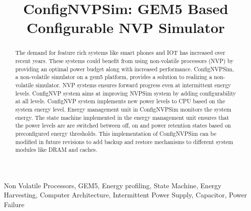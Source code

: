 \documentclass[conference]{IEEEtran}
\begin{document}
\title{ConfigNVPSim: GEM5 Based Configurable NVP Simulator\\
}

\author{
\and
{}
\and
{}
}

\maketitle

\begin{abstract}
The demand for feature rich systems like smart phones and IOT has increased over recent years. These systems could benefit from using non-volatile processors (NVP) by providing an optimal power budget along with increased performance. ConfigNVPSim, a non-volatile simulator on a gem5 platform, provides a solution to realizing a non-volatile simulator. NVP systems ensures forward progress even at intermittent energy levels. ConfigNVP system aims at improving NVPSim \cite{b1} system by adding configurability at all levels. ConfigNVP system implements new power levels to CPU based on the system energy level. Energy management unit in ConfigNVPSim monitors the system energy. The state machine implemented in the energy management unit ensures that the power levels are are switched between off, on and power retention states based on preconfigured energy thresholds. This implementation of ConfigNVPSim can be modified in future revisions to add backup and restore mechanisms to different system modules like DRAM and caches.   
\end{abstract}
\vspace{5 mm}
\begin{IEEEkeywords}
Non Volatile Processors, GEM5, Energy profiling, State Machine, Energy Harvesting, Computer Architecture, Intermittent Power Supply, Capacitor, Power Failure
\end{IEEEkeywords}
\end{document}

